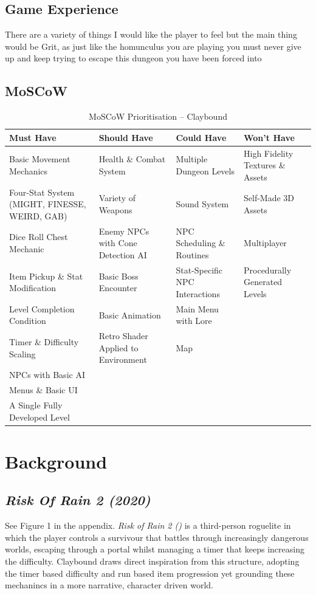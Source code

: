 \documentclass[progress]{cmpreport}
\begin{document}
\subsection{Game Experience}
There are a variety of things I would like the player to feel but the main thing would be Grit, as just like the homunculus you are playing you must never give up and keep trying to escape
this dungeon you have been forced into

\subsection{MoSCoW}
\begin{table}[h]
\centering
\small
\begin{tabular}{p{3.5cm}p{3.5cm}p{3.5cm}p{3.5cm}}
\toprule
\textbf{Must Have} & \textbf{Should Have} & \textbf{Could Have} & \textbf{Won't Have} \\
\midrule
Basic Movement Mechanics & Health \& Combat System & Multiple Dungeon Levels & High Fidelity Textures \& Assets \\
\addlinespace
Four-Stat System (MIGHT, FINESSE, WEIRD, GAB) & Variety of Weapons & Sound System & Self-Made 3D Assets \\
\addlinespace
Dice Roll Chest Mechanic & Enemy NPCs with Cone Detection AI & NPC Scheduling \& Routines & Multiplayer \\
\addlinespace
Item Pickup \& Stat Modification & Basic Boss Encounter & Stat-Specific NPC Interactions & Procedurally Generated Levels \\
\addlinespace
Level Completion Condition & Basic Animation & Main Menu with Lore & \\
\addlinespace
Timer \& Difficulty Scaling & Retro Shader Applied to Environment & Map & \\
\addlinespace
NPCs with Basic AI & & & \\
\addlinespace
Menus \& Basic UI & & & \\
\addlinespace
A Single Fully Developed Level & & & \\
\bottomrule
\end{tabular}
\caption{MoSCoW Prioritisation -- Claybound}
\label{tab:moscow}
\end{table}


\clearpage
\section{Background}

\subsection{\emph{Risk Of Rain 2 (2020)}}
See Figure 1 in the appendix. \textit{Risk of Rain 2 (\cite{ror2})} is a third-person roguelite in which the player controls a survivour that battles through 
increasingly dangerous worlds, escaping through a portal whilst managing a timer that keeps increasing the difficulty. Claybound draws direct inspiration
from this structure, adopting the timer based difficulty and run based item progression yet grounding these mechanincs in a more narrative, character driven world.
\end{document}
